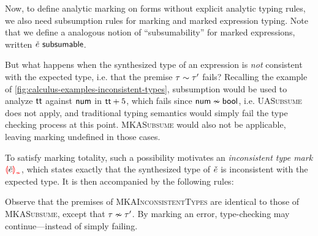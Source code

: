 Now, to define analytic marking on forms without explicit analytic typing rules, we also need
subsumption rules for marking and marked expression typing. Note that we define a analogous notion
of ``subsumability'' for marked expressions, written $\subsumable{\ECMV}$.
%
\begin{mathpar}

\end{mathpar}

But what happens when the synthesized type of an expression is \emph{not} consistent with the
expected type, i.e. that the premise $\consistent{\TMV}{\TMV'}$ fails? Recalling the example of
\cref{fig:calculus-examples-inconsistent-types}, subsumption would be used to analyze $\ETrue$
against $\TNum$ in $\EPlus{\ETrue}{5}$, which fails since $\inconsistent{\TNum}{\TBool}$, i.e.
\textsc{UASubsume} does not apply, and traditional typing semantics would simply fail the type
checking process at this point. \textsc{MKASubsume} would also not be applicable, leaving marking
undefined in those cases.


To satisfy marking totality, such a possibility motivates an \emph{inconsistent type mark}
$\ECInconType{\ECMV}$, which states exactly that the synthesized type of $\ECMV$ is inconsistent
with the expected type. It is then accompanied by the following rules:
%
\begin{mathpar}

\end{mathpar}
%
Observe that the premises of \textsc{MKAInconsistentTypes} are identical to those of
\textsc{MKASubsume}, except that $\inconsistent{\TMV}{\TMV'}$. By marking an error, type-checking
may continue---instead of simply failing.

